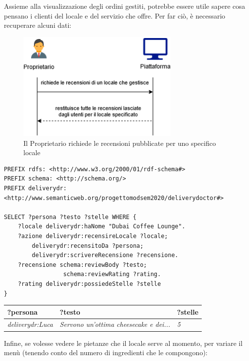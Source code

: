 \documentclass[12pt]{article}
\begin{document}
\newline
\newline
\newline
Assieme alla visualizzazione degli ordini gestiti, potrebbe essere utile sapere cosa pensano i clienti del locale e del servizio che offre. Per far ciò, è necessario recuperare alcuni dati:
\begin{figure}[H]
    \centering
         \includegraphics[width=8cm]{files/Proprietario 2.png}
    \caption{Il Proprietario richiede le recensioni pubblicate per uno specifico locale}
\end{figure}
\begin{lstlisting}[language=SPARQL]
PREFIX rdfs: <http://www.w3.org/2000/01/rdf-schema#>
PREFIX schema: <http://schema.org/>
PREFIX deliverydr: 
<http://www.semanticweb.org/progettomodsem2020/deliverydoctor#>

SELECT ?persona ?testo ?stelle WHERE {
    ?locale deliverydr:haNome "Dubai Coffee Lounge".
    ?azione deliverydr:recensireLocale ?locale;
    	deliverydr:recensitoDa ?persona;
    	deliverydr:scrivereRecensione ?recensione.
    ?recensione schema:reviewBody ?testo;
                 schema:reviewRating ?rating.
    ?rating deliverydr:possiedeStelle ?stelle
}
\end{lstlisting}
\begin{tabularx}{\textwidth} {
  | >{\centering\arraybackslash}X 
  | >{\centering\arraybackslash}X
  | >{\centering\arraybackslash}X |}
 \hline
 \textbf{?persona} & \textbf{?testo} & \textbf{?stelle} \\
 \hline
 \textit{deliverydr:Luca} & \textit{Servono un'ottima cheesecake e dei...} & \textit{5}  \\
 \hline
\end{tabularx}
\newline
\newline
\newline
Infine, se volesse vedere le pietanze che il locale serve al momento, per variare il menù (tenendo conto del numero di ingredienti che le compongono):
\end{document}
